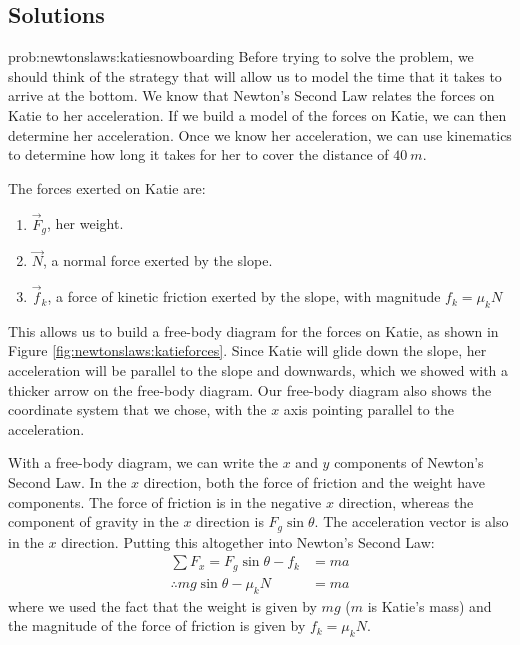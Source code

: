 \newpage
\subsection{Solutions}
\begin{solution}{prob:newtonslaws:katiesnowboarding}\label{soln:newtonslaws:katiesnowboarding}
Before trying to solve the problem, we should think of the strategy that will allow us to model the time that it takes to arrive at the bottom. We know that Newton's Second Law relates the forces on Katie to her acceleration. If we build a model of the forces on Katie, we can then determine her acceleration. Once we know her acceleration, we can use kinematics to determine how long it takes for her to cover the distance of $\SI{40}{m}$.

The forces exerted on Katie are:
\begin{enumerate}
\item $\vec F_g$, her weight.
\item $\vec N$, a normal force exerted by the slope.
\item $\vec f_k$, a force of kinetic friction exerted by the slope, with magnitude $f_k=\mu_kN$ 
\end{enumerate}

This allows us to build a free-body diagram for the forces on Katie, as shown in Figure \ref{fig:newtonslaws:katieforces}. Since Katie will glide down the slope, her acceleration will be parallel to the slope and downwards, which we showed with a thicker arrow on the free-body diagram. Our free-body diagram also shows the coordinate system that we chose, with the $x$ axis pointing parallel to the acceleration. 


With a free-body diagram, we can write the $x$ and $y$ components of Newton's Second Law. In the $x$ direction, both the force of friction and the weight have components. The force of friction is in the negative $x$ direction, whereas the component of gravity in the $x$ direction is $F_g\sin\theta$. The acceleration vector is also in the $x$ direction. Putting this altogether into Newton's Second Law:
\begin{align*}
\sum F_x = F_g\sin\theta - f_k &= ma\\
\therefore mg\sin\theta -\mu_k N &= ma
\end{align*}
where we used the fact that the weight is given by $mg$ ($m$ is Katie's mass) and the magnitude of the force of friction is given by $f_k=\mu_kN$.


\end{solution}
